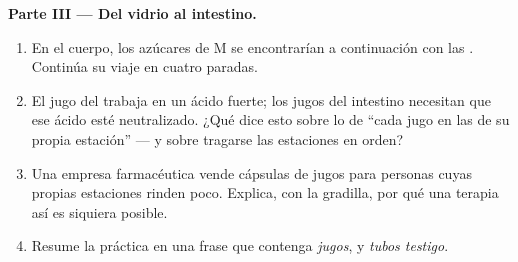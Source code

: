 \begin{problem}
\medskip\noindent\textbf{Parte III --- Del vidrio al intestino.}
\begin{enumerate}[resume]
  \item En el cuerpo, los azúcares de M se encontrarían a continuación
        con las . Continúa su viaje en cuatro paradas.
  \item El jugo del  trabaja en un ácido fuerte; los jugos del
        intestino necesitan que ese ácido esté neutralizado. ¿Qué dice
        esto sobre lo de ``cada jugo en las  de su propia
        estación'' --- y sobre tragarse las estaciones en orden?
  \item Una empresa farmacéutica vende cápsulas de jugos para personas
        cuyas propias estaciones rinden poco. Explica, con la gradilla,
        por qué una terapia así es siquiera posible.
  \item Resume la práctica en una frase que contenga \emph{jugos},
        \emph{} y \emph{tubos testigo}.
\end{enumerate}
\end{problem}
